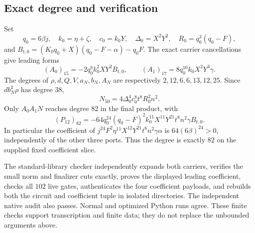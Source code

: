 \subsection{Exact degree and verification}

Set
\[
 q_0=6\beta j,\quad k_0=\eta+\zeta,\quad c_0=k_0Y,
 \quad\Delta_0=X^2Y^2,\quad R_0=q_0^3(q_0-F),
\]
and $B_{t,0}=(K_0q_0+X)(q_0-F-\alpha)-q_0F$.
The exact carrier cancellations give leading forms
\[
 (A_0)_{15}=-2q_0^8k_0^2XY^2B_{t,0},\qquad
 (A_1)_{17}=8q_0^{10}k_0X^2Y^3\gamma.
\]
The degrees of $\rho,d,Q,V,a_N,b_N,A_N$ are respectively
$2,12,6,6,13,12,25$.  Since $db_N^2\rho$ has degree $38$,
\[
 N_{50}=4\Delta_0^4c_0^8t^8R_0^2n^2.
\]
Only $A_0A_1N$ reaches degree $82$ in the final product, with
\begin{equation}
 (P_{12})_{82}=-64q_0^{24}(q_0-F)^2 k_0^{11}
 X^{11}Y^{21}t^8n^2\gamma B_{t,0}.                     \label{eq:sat-leader}
\end{equation}
In particular the coefficient of
$j^{24}F^2\eta^{11}X^{12}Y^{21}t^8n^2\gamma\alpha$
is $64(6\beta)^{24}>0$, independently of the other three ports.
Thus the degree is exactly $82$ on the supplied fixed coefficient slice.

The standard-library checker independently expands both carriers, verifies
the small norm and finalizer cuts exactly, proves the displayed leading
coefficient, checks all $102$ live gates, authenticates the four coefficient
payloads, and rebuilds both the circuit and coefficient tuple in isolated
directories.  The independent native audit also passes.  Normal and
optimized Python runs agree.  These finite checks support transcription
and finite data; they do not replace the unbounded arguments above.
